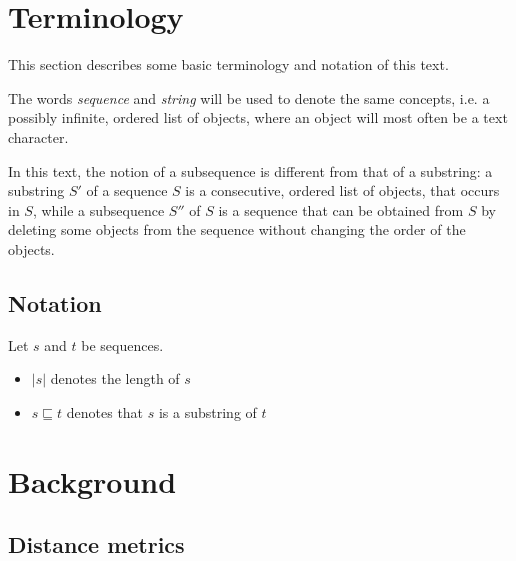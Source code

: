 \documentclass[11pt,a4paper]{article}
\begin{document}
\section{Terminology}
This section describes some basic terminology and notation of this text.

The words \emph{sequence} and \emph{string} will be used to denote the same
concepts, i.e. a possibly infinite, ordered list of objects, where an object
will most often be a text character.

In this text, the notion of a subsequence is different from that of a
substring: a substring $S'$ of a sequence $S$ is a consecutive, ordered list of
objects, that occurs in $S$, while a subsequence $S''$ of $S$ is a sequence
that can be obtained from $S$ by deleting some objects from the sequence
without changing the order of the objects.


\subsection{Notation}
Let $s$ and $t$ be sequences.
\begin{itemize}
  \item $|s|$ denotes the length of $s$
  \item $s \sqsubseteq t$ denotes that $s$ is a substring of $t$
\end{itemize}


\section{Background}

\subsection{Distance metrics}
\end{document}

